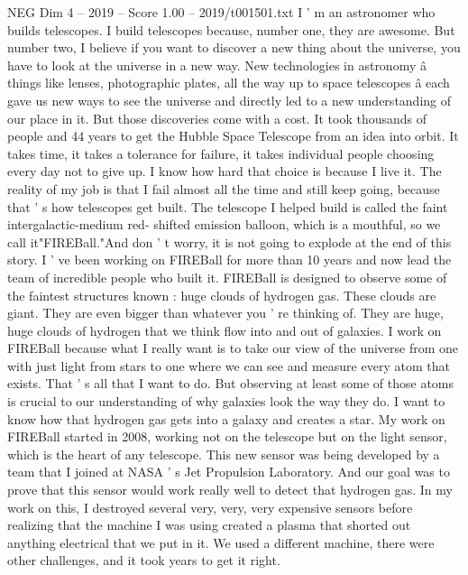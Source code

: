\begin{textsample}{NEG Dim 4 – 2019 – Score 1.00 – 2019/t001501.txt}  \label{ex:f4_neg_034}
I ' m an astronomer who builds telescopes.
I build telescopes because, number one, they are awesome.
But number two, I believe if you want to discover a new thing about the universe, you have to look at the universe in a new way.
New technologies in astronomy â things like lenses, photographic plates, all the way up to space telescopes â each gave us new ways to see the universe and directly led to a new understanding of our place in it.
But those discoveries come with a cost.
It took thousands of people and 44 years to get the Hubble Space Telescope from an idea into orbit.
It takes time, it takes a tolerance for failure, it takes individual people choosing every day not to give up.
I know how hard that choice is because I live it.
The reality of my job is that I fail almost all the time and still keep going, because that ' s how telescopes get built.
The telescope I helped build is called the faint intergalactic-medium red- shifted emission balloon, which is a mouthful, so we call it"FIREBall."And don ' t worry, it is not going to explode at the end of this story.
I ' ve been working on FIREBall for more than 10 years and now lead the team of incredible people who built it.
FIREBall is designed to observe some of the faintest structures known : huge clouds of hydrogen gas.
These clouds are giant.
They are even bigger than whatever you ' re thinking of.
They are huge, huge clouds of hydrogen that we think flow into and out of galaxies.
I work on FIREBall because what I really want is to take our view of the universe from one with just light from stars to one where we can see and measure every atom that exists.
That ' s all that I want to do.
But observing at least some of those atoms is crucial to our understanding of why galaxies look the way they do.
I want to know how that hydrogen gas gets into a galaxy and creates a star.
My work on FIREBall started in 2008, working not on the telescope but on the light sensor, which is the heart of any telescope.
This new sensor was being developed by a team that I joined at NASA ' s Jet Propulsion Laboratory.
And our goal was to prove that this sensor would work really well to detect that hydrogen gas.
In my work on this, I destroyed several very, very, very expensive sensors before realizing that the machine I was using created a plasma that shorted out anything electrical that we put in it.
We used a different machine, there were other challenges, and it took years to get it right.

\end{textsample}
